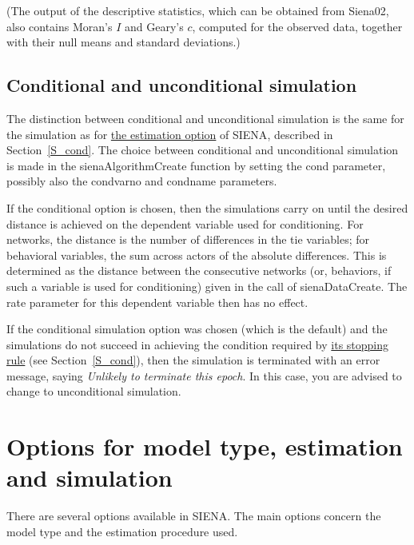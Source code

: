 \documentclass[a4paper,fleqn,11pt]{article}
\newcommand{\+}{\, + \,}
\newcommand{\si}{{\sf SIENA}}
\begin{document}
(The output of the descriptive statistics, which can be obtained
from \textsf{Siena02}, also contains Moran's $I$ and Geary's $c$,
computed for the observed data, together with their
null means and standard deviations.)
\fi


\subsection{Conditional and unconditional simulation}
\label{S_conds}

The distinction between conditional and unconditional simulation
is the same for the simulation as for
\hyperlink{T_S_cond}{the estimation option}
of \si, described in Section~\ref{S_cond}.
The choice between conditional and
unconditional simulation is
made in the \textsf{sienaAlgorithmCreate} function by setting the
\textsf{cond} parameter, possibly also the
\textsf{condvarno} and \textsf{condname} parameters.

If the conditional option is chosen, then the simulations
carry on until the desired distance is achieved on the dependent
variable used for conditioning.
For networks, the distance is the number of differences in the
tie variables; for behavioral variables, the sum
across actors of the absolute differences.
This is determined as the
distance between the consecutive networks (or, behaviors,
if such a variable is used for conditioning) given in the call of
\textsf{sienaDataCreate}.
The rate parameter for this dependent variable then
has no effect.

If the conditional simulation option was chosen (which is the
default) and the simulations do not succeed in achieving the
condition required by
\hyperlink{T_distance_stop}{its stopping rule}
(see Section~\ref{S_cond}), then the simulation is
terminated with an error message, saying
\emph{Unlikely to terminate this epoch}.
In this case, you are advised to change to unconditional simulation.

\iffalse
\newpage
\section[Options for model type, estimation and simulation]
        {Options for model type, estimation and simulation}
\label{S_options}

\hypertarget{T_S_options}{}
There are several options available in \si. The main options
concern the model type and the estimation procedure used.
\end{document}
